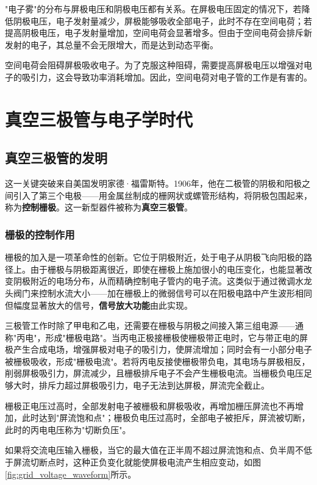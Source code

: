 \documentclass[12pt,UTF8]{ctexbook}
\begin{document}
"电子雾"的分布与屏极电压和阴极电压都有关系。在屏极电压固定的情况下，若降低阴极电压，电子发射量减少，屏极能够吸收全部电子，此时不存在空间电荷；若提高阴极电压，电子发射量增加，空间电荷会显著增多。但由于空间电荷会排斥新发射的电子，其总量不会无限增大，而是达到动态平衡。

空间电荷会阻碍屏极吸收电子。为了克服这种阻碍，需要提高屏极电压以增强对电子的吸引力，这会导致功率消耗增加。因此，空间电荷对电子管的工作是有害的。

\part{真空三极管与电子学时代}

\chapter{真空三极管的发明}

这一关键突破来自美国发明家德·福雷斯特。1906年，他在二极管的阴极和阳极之间引入了第三个电极——用金属丝制成的栅网状或螺管形结构，将阴极包围起来，称为\textbf{控制栅极}。这一新型器件被称为\textbf{真空三极管}。

\section{栅极的控制作用}

栅极的加入是一项革命性的创新。它位于阴极附近，处于电子从阴极飞向阳极的路径上。由于栅极与阴极距离很近，即使在栅极上施加很小的电压变化，也能显著改变阴极附近的电场分布，从而精确控制电子管内的电子流。这类似于通过微调水龙头阀门来控制水流大小——加在栅极上的微弱信号可以在阳极电路中产生波形相同但幅度显著放大的信号，\textbf{信号放大功能}由此实现。

三极管工作时除了甲电和乙电，还需要在栅极与阴极之间接入第三组电源——通称"丙电"，形成"栅极电路"。当丙电正极接栅极使栅极带正电时，它与带正电的屏极产生合成电场，增强屏极对电子的吸引力，使屏流增加；同时会有一小部分电子被栅极吸收，形成"栅极电流"。若将丙电反接使栅极带负电，其电场与屏极相反，削弱屏极吸引力，屏流减少，且栅极排斥电子不会产生栅极电流。当栅极负电压足够大时，排斥力超过屏极吸引力，电子无法到达屏极，屏流完全截止。

栅极正电压过高时，全部发射电子被栅极和屏极吸收，再增加栅压屏流也不再增加，此时达到"屏流饱和点"；栅极负电压过高时，全部电子被拒斥，屏流被切断，此时的丙电电压称为"切断负压"。

如果将交流电压输入栅极，当它的最大值在正半周不超过屏流饱和点、负半周不低于屏流切断点时，这种正负变化就能使屏极电流产生相应变动，如图\ref{fig:grid_voltage_waveform}所示。
\end{document}
